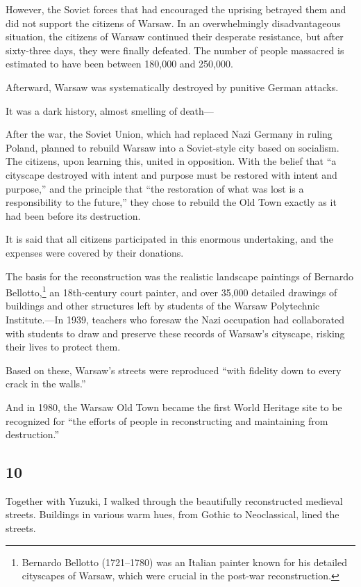 \documentclass[
    a4paper,
    12pt,
    twoside,
    openany,
    UTF8,
    fontset=windows
]{ctexbook}
\begin{document}
However, the Soviet forces that had encouraged the uprising betrayed them and did not support the citizens of Warsaw. In an overwhelmingly disadvantageous situation, the citizens of Warsaw continued their desperate resistance, but after sixty-three days, they were finally defeated. The number of people massacred is estimated to have been between 180,000 and 250,000.

Afterward, Warsaw was systematically destroyed by punitive German attacks.

It was a dark history, almost smelling of death---

After the war, the Soviet Union, which had replaced Nazi Germany in ruling Poland, planned to rebuild Warsaw into a Soviet-style city based on socialism. The citizens, upon learning this, united in opposition. With the belief that ``a cityscape destroyed with intent and purpose must be restored with intent and purpose,'' and the principle that ``the restoration of what was lost is a responsibility to the future,'' they chose to rebuild the Old Town exactly as it had been before its destruction.

It is said that all citizens participated in this enormous undertaking, and the expenses were covered by their donations.

The basis for the reconstruction was the realistic landscape paintings of Bernardo Bellotto,\footnote{Bernardo Bellotto (1721–1780) was an Italian painter known for his detailed cityscapes of Warsaw, which were crucial in the post-war reconstruction.} an 18th-century court painter, and over 35,000 detailed drawings of buildings and other structures left by students of the Warsaw Polytechnic Institute.---In 1939, teachers who foresaw the Nazi occupation had collaborated with students to draw and preserve these records of Warsaw's cityscape, risking their lives to protect them.

Based on these, Warsaw's streets were reproduced ``with fidelity down to every crack in the walls.''

And in 1980, the Warsaw Old Town became the first World Heritage site to be recognized for ``the efforts of people in reconstructing and maintaining from destruction.''


\subsection*{10}

Together with Yuzuki, I walked through the beautifully reconstructed medieval streets. Buildings in various warm hues, from Gothic to Neoclassical, lined the streets.
\end{document}
